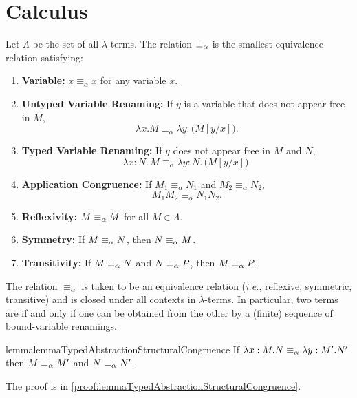 \section{Calculus}

\begin{definition}
\label{def:alpha_equiv}
Let $\Lambda$ be the set of all $\lambda$-terms. The \alphaequivalence relation 
$\equiv_\alpha$ is the smallest equivalence relation satisfying:

\begin{enumerate}
    \item \textbf{Variable:} \( x \equiv_\alpha x \) for any variable \( x \).
    \item \textbf{Untyped Variable Renaming:} If \( y \) is a variable that does not appear free in \( M \),
      \[
        \lambda x.M \equiv_\alpha \lambda y.\,\bigl(M[y/x]\bigr).
      \]
    \item \textbf{Typed Variable Renaming:} If \( y \) does not appear free in \( M \) and \( N \),
      \[
        \lambda x:N.\,M \equiv_\alpha \lambda y:N.\,\bigl(M[y/x]\bigr).
      \]
    \item \textbf{Application Congruence:} If \( M_1 \equiv_\alpha N_1 \) and \( M_2 \equiv_\alpha N_2 \),
      \[
        M_1 M_2 \equiv_\alpha N_1 N_2.
      \]
    \item \textbf{Reflexivity:} \( M \equiv_\alpha M \) for all \( M \in \Lambda \).
    \item \textbf{Symmetry:} If \( M \equiv_\alpha N \), then \( N \equiv_\alpha M \).
    \item \textbf{Transitivity:} If \( M \equiv_\alpha N \) and \( N \equiv_\alpha P \), then \( M \equiv_\alpha P \).
\end{enumerate}

The relation $\equiv_\alpha$ is taken to be an equivalence relation 
(\emph{i.e.}, reflexive, symmetric, transitive) and is closed under all 
contexts in $\lambda$-terms. In particular, two terms are \alphaequivalent 
if and only if one can be obtained from the other by a (finite) sequence of 
bound-variable renamings.
\end{definition}

\begin{reusable}{lemma}{lemmaTypedAbstractionStructuralCongruence}
If $\lambda x:M.N \equiv_\alpha \lambda y:M'.N'$ then $M \equiv_\alpha M'$ and $N \equiv_\alpha N'$.
\end{reusable}
The proof is in \cref{proof:lemmaTypedAbstractionStructuralCongruence}.

